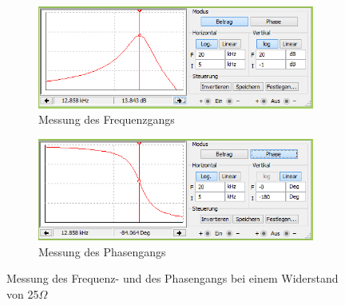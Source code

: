 \documentclass[12pt,a4paper]{article}
\begin{document}
\begin{figure}[H]
        \centering
        \begin{subfigure}[b]{0.48\textwidth}
                \includegraphics[width=\textwidth , scale = 0.4]{2_3_bode_betrag_25Ohm.PNG}
                \caption[Messung des Frequenzgangs]{Messung des Frequenzgangs}
 				 \label{fig:2_3_25_betrag}
        \end{subfigure}%
        \hfill
        \begin{subfigure}[b]{0.48\textwidth}
                \includegraphics[width=\textwidth , scale = 0.4]{2_3_bode_phase_25Ohm.PNG}
                \caption[Messung des Phasengangs]{Messung des Phasengangs}
  				\label{fig:2_3_25_phase}
        \end{subfigure}
        \caption{Messung des Frequenz- und des Phasengangs bei einem Widerstand von 25$\Omega$}
        \label{fig:2_3_2_1}
\end{figure}
\end{document}
